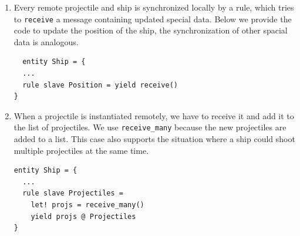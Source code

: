 \begin{enumerate}
	\item Every remote projectile and ship is synchronized locally by a rule, which tries to \texttt{receive} a message containing updated special data. Below we provide the code to update the position of the ship, the synchronization of other spacial data is analogous.
	
\begin{lstlisting}
  entity Ship = {
  ...
  rule slave Position = yield receive()
}
\end{lstlisting}
	
	\item When a projectile is instantiated remotely, we have to receive it and add it to the list of projectiles. We use \texttt{receive\_many} because the new projectiles are added to a list. This case also supports the situation where a ship could shoot multiple projectiles at the same time.
	
\begin{lstlisting}
entity Ship = {
  ...
  rule slave Projectiles =
    let! projs = receive_many()
    yield projs @ Projectiles
}
\end{lstlisting} 
\end{enumerate}

